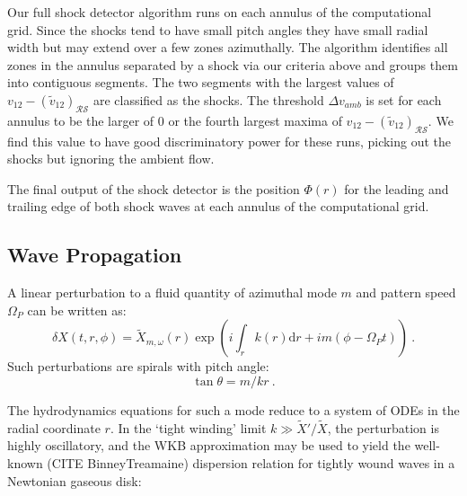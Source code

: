 \documentclass{emulateapj}
\newcommand{\dd}{\mbox{d}}
\begin{document}
Our full shock detector algorithm runs on each annulus of the computational grid.  Since the shocks tend to have small pitch angles they have small radial width but may extend over a few zones azimuthally.  The algorithm identifies all zones in the annulus separated by a shock via our criteria above and groups them into contiguous segments.  The two segments with the largest values of $v_{12} -  (\tilde{v}_{12})_{\mathcal{R}\mathcal{S}} $ are classified as the shocks. The threshold $\Delta v_{amb}$ is set for each annulus to be the larger of $0$ or the fourth largest maxima of $v_{12} -  (\tilde{v}_{12})_{\mathcal{R}\mathcal{S}} $. We find this value to have good discriminatory power for these runs, picking out the shocks but ignoring the ambient flow.

The final output of the shock detector is the position $\Phi(r)$ for the leading and trailing edge of both shock waves at each annulus of the computational grid.

\subsection{Wave Propagation}

A linear perturbation to a fluid quantity of azimuthal mode $m$ and pattern speed $\Omega_P$ can be written as:
\begin{equation}
	\delta X(t, r, \phi) = \tilde{X}_{m,\omega}(r) \exp \left( i \int_r k(r) \dd r  + i m (\phi - \Omega_P t) \right)\ . \label{eq:pert}
\end{equation}
Such perturbations are spirals with pitch angle:
\begin{equation}
	\tan \theta = m / k r \ . \label{eq:pitch}
\end{equation}

The hydrodynamics equations for such a mode reduce to a system of ODEs in the radial coordinate $r$.  In the `tight winding' limit $k \gg \tilde{X}'/\tilde{X}$, the perturbation is highly oscillatory, and the WKB approximation may be used to yield the well-known (CITE BinneyTreamaine) dispersion relation for tightly wound waves in a Newtonian gaseous disk:
\end{document}
